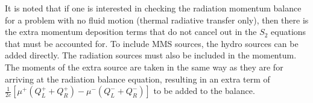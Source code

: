 \documentclass[preprint,12pt]{elsarticle}
\begin{document}
It is noted that if one is interested in checking the radiation momentum balance for
a problem with no fluid motion (thermal radiative transfer only), then there is
the extra momentum deposition terms that do not cancel out in the $S_2$ equations
that must be accounted for.  To include MMS sources, the hydro sources can be added directly.  The radiation
sources must also be included in the momentum.  The moments of the extra source are taken in the same way
as they are for arriving at the radiation balance equation, resulting in an extra
term of $\frac{1}{2c}[\mu^+(Q_L^+ + Q_R^+) - \mu^-(Q_L^- + Q_R^-)]$ to be added to
the balance.
\end{document}
